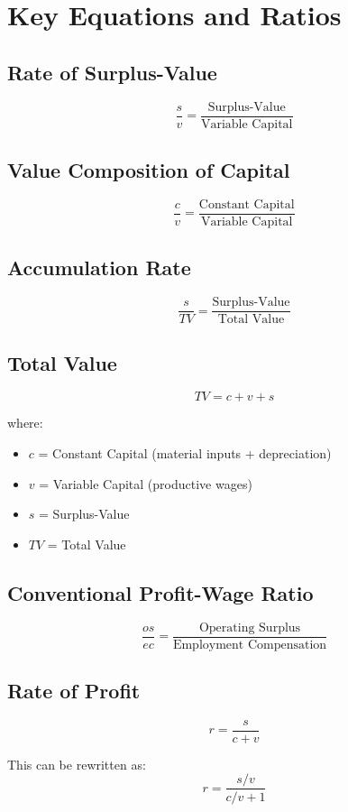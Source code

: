 \documentclass{article}
\begin{document}
\section*{Key Equations and Ratios}

\subsection*{Rate of Surplus-Value}
\begin{equation}
\frac{s}{v} = \frac{\text{Surplus-Value}}{\text{Variable Capital}}
\end{equation}

\subsection*{Value Composition of Capital}
\begin{equation}
\frac{c}{v} = \frac{\text{Constant Capital}}{\text{Variable Capital}}
\end{equation}

\subsection*{Accumulation Rate}
\begin{equation}
\frac{s}{TV} = \frac{\text{Surplus-Value}}{\text{Total Value}}
\end{equation}

\subsection*{Total Value}
\begin{equation}
TV = c + v + s
\end{equation}

where:
\begin{itemize}
\item $c$ = Constant Capital (material inputs + depreciation)
\item $v$ = Variable Capital (productive wages)
\item $s$ = Surplus-Value
\item $TV$ = Total Value
\end{itemize}

\subsection*{Conventional Profit-Wage Ratio}
\begin{equation}
\frac{os}{ec} = \frac{\text{Operating Surplus}}{\text{Employment Compensation}}
\end{equation}

\subsection*{Rate of Profit}
\begin{equation}
r = \frac{s}{c + v}
\end{equation}

This can be rewritten as:
\begin{equation}
r = \frac{s/v}{c/v + 1}
\end{equation}
\end{document}
